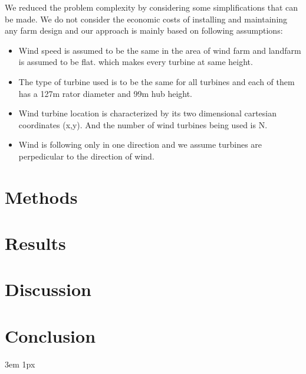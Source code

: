 \documentclass{Academic}
\begin{document}
We reduced the problem complexity by considering some simplifications that can be made. We do not consider the economic costs of installing and maintaining any farm design and our approach is mainly based on following assumptions:
\begin{itemize}
  \item Wind speed is assumed to be the same in the area of wind farm and landfarm is assumed to be flat. which makes every turbine at same height.
  \item The type of turbine used is to be the same for all turbines and each of them has a 127{m} rator diameter and 99{m} hub height.
  \item Wind turbine location is characterized by its two dimensional cartesian coordinates (x,y). And the number of wind turbines being used is N.
  \item Wind is following only in one direction and we assume turbines are perpedicular to the direction of wind.
\end{itemize}

\section{Methods}

 


\section{Results}




\section{Discussion}



\section{Conclusion}




\singlespacing
\emergencystretch 3em
\hfuzz 1px
\printbibliography[heading=bibnumbered]




\end{document}

